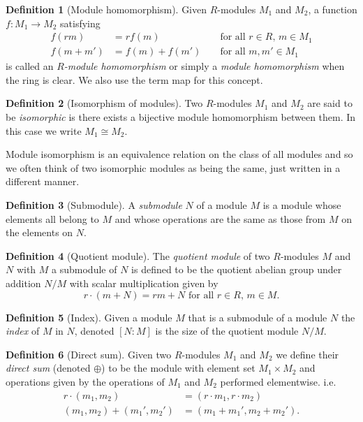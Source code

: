 \documentclass[12pt,a4paper,abstracton,bibtotoc]{scrreprt}
\theoremstyle{definition}
\newtheorem{defn}{Definition}
\begin{document}
\begin{defn}[Module homomorphism]
Given $R$-modules $M_1$ and $M_2$, a function $f\colon M_1 \to M_2$ satisfying
\begin{align*}
f(rm) &= rf(m) &&\text{ for all $r\in R$, $m\in M_1$}\\
f(m + m') &= f(m) + f(m')&&\text{ for all $m,m'\in M_1$}
\end{align*}
is called an \emph{$R$-module homomorphism} or simply a \emph{module homomorphism} when the ring is clear.
We also use the term map for this concept.
\end{defn}

\begin{defn}[Isomorphism of modules]
Two $R$-modules $M_1$ and $M_2$ are said to be \emph{isomorphic} is there exists a bijective module homomorphism between them. 
In this case we write $M_1\cong M_2$.
\end{defn}

Module isomorphism is an equivalence relation on the class of all modules and so we often think of two isomorphic modules as being the same, just written in a different manner.

\begin{defn}[Submodule]
A \emph{submodule} $N$ of a module $M$ is a module whose elements all belong to $M$ and whose operations are the same as those from $M$ on the elements on $N$.
\end{defn}

\begin{defn}[Quotient module]
The \emph{quotient module} of two $R$-modules $M$ and $N$ with $M$ a submodule of $N$ is defined to be the quotient abelian group under addition $N/
M$ with scalar multiplication given by
\[
r\cdot(m + N) = rm + N\text{ for all $r\in R$, $m\in M$}.
\]
\end{defn}

\begin{defn}[Index]
Given a module $M$ that is a submodule of a module $N$ the \emph{index} of $M$ in $N$, denoted $[N:M]$ is the size of the quotient module $N / M$.
\end{defn}

\begin{defn}[Direct sum]
Given two $R$-modules $M_1$ and $M_2$ we define their \emph{direct sum} (denoted $\oplus$) to be the module with element set $M_1 \times M_2$ and operations given by the operations of $M_1$ and $M_2$ performed elementwise. i.e.
\begin{align*}
r\cdot(m_1,m_2) &= (r\cdot m_1, r\cdot m_2)\\
(m_1,m_2) + (m_1',m_2') &= (m_1 + m_1',m_2+m_2').
\end{align*}
\end{defn}
\end{document}

